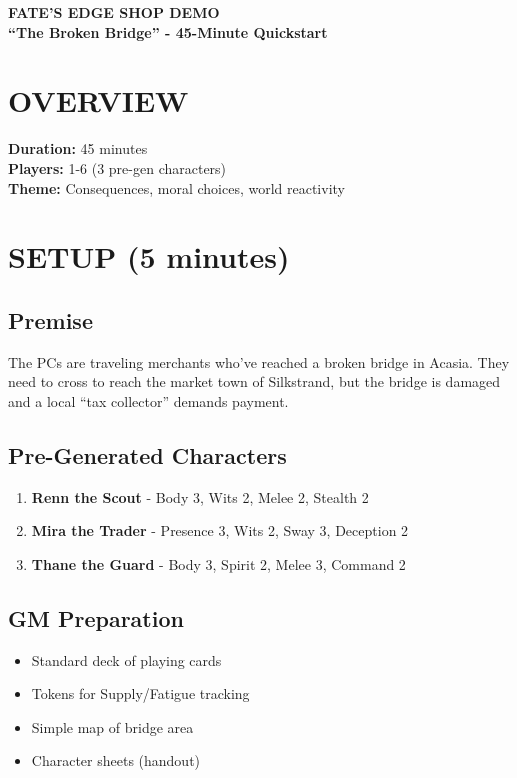 \documentclass[12pt]{article}
\begin{document}
\begin{center}
{\LARGE \textbf{FATE'S EDGE SHOP DEMO}} \\
{\large \textbf{``The Broken Bridge'' - 45-Minute Quickstart}}
\end{center}

\section*{OVERVIEW}

\textbf{Duration:} 45 minutes \\
\textbf{Players:} 1-6 (3 pre-gen characters) \\
\textbf{Theme:} Consequences, moral choices, world reactivity

\section{SETUP (5 minutes)}

\subsection*{Premise}
The PCs are traveling merchants who've reached a broken bridge in Acasia. They need to cross to reach the market town of Silkstrand, but the bridge is damaged and a local ``tax collector'' demands payment.

\subsection*{Pre-Generated Characters}
\begin{enumerate}
\item \textbf{Renn the Scout} - Body 3, Wits 2, Melee 2, Stealth 2
\item \textbf{Mira the Trader} - Presence 3, Wits 2, Sway 3, Deception 2  
\item \textbf{Thane the Guard} - Body 3, Spirit 2, Melee 3, Command 2
\end{enumerate}

\subsection*{GM Preparation}
\begin{itemize}
\item Standard deck of playing cards
\item Tokens for Supply/Fatigue tracking
\item Simple map of bridge area
\item Character sheets (handout)
\end{itemize}
\end{document}
